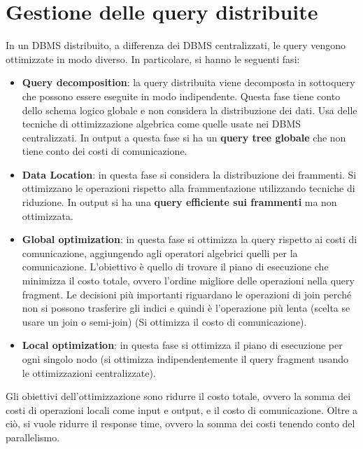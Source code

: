 \section{Gestione delle query distribuite}
In un DBMS distribuito, a differenza dei DBMS centralizzati, le query vengono ottimizzate
in modo diverso. In particolare, si hanno le seguenti fasi:
\begin{itemize}
      \item \textbf{Query decomposition}: la query distribuita viene decomposta in
            sottoquery che possono essere eseguite in modo indipendente. Questa
            fase tiene conto dello schema logico globale e non considera la
            distribuzione dei dati. Usa delle tecniche di ottimizzazione algebrica
            come quelle usate nei DBMS centralizzati.
            In output a questa fase si ha un \textbf{query tree globale} che non tiene
            conto dei costi di comunicazione.
      \item \textbf{Data Location}: in questa fase si considera la distribuzione
            dei frammenti. Si ottimizzano le operazioni rispetto alla
            frammentazione utilizzando tecniche di riduzione. In output si ha una
            \textbf{query efficiente sui frammenti} ma non ottimizzata.
      \item \textbf{Global optimization}: in questa fase si ottimizza la query
            rispetto ai costi di comunicazione, aggiungendo agli operatori
            algebrici quelli per la comunicazione. L'obiettivo è quello di
            trovare il piano di esecuzione che minimizza il costo totale, ovvero
            l'ordine migliore delle operazioni nella query fragment. Le
            decisioni più importanti riguardano le operazioni di join perché
            non si possono trasferire gli indici e quindi è l'operazione più lenta
            (scelta se usare un join o semi-join) (Si ottimizza il costo di comunicazione).
      \item \textbf{Local optimization}: in questa fase si ottimizza il piano di
            esecuzione per ogni singolo nodo (si ottimizza indipendentemente il
            query fragment usando le ottimizzazioni centralizzate).
\end{itemize}
Gli obiettivi dell'ottimizzazione sono ridurre il costo totale, ovvero la somma
dei costi di operazioni locali come input e output, e il costo di comunicazione.
Oltre a ciò, si vuole ridurre il response time, ovvero la somma dei costi tenendo
conto del parallelismo.
